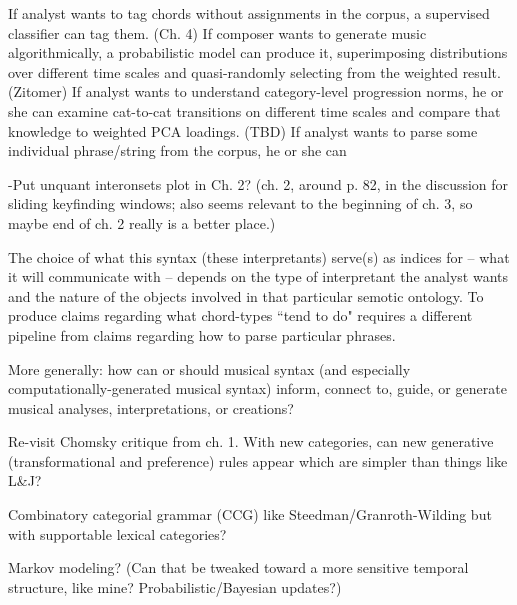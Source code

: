 
If analyst wants to tag chords without assignments in the corpus, a supervised classifier can tag them.  (Ch. 4)
If composer wants to generate music algorithmically, a probabilistic model can produce it, superimposing distributions over different time scales and quasi-randomly selecting from the weighted result.  (Zitomer)
If analyst wants to understand category-level progression norms, he or she can examine cat-to-cat transitions on different time scales and compare that knowledge to weighted PCA loadings.  (TBD)
If analyst wants to parse some individual phrase/string from the corpus, he or she can 

-Put unquant interonsets plot in Ch. 2?  (ch. 2, around p. 82, in the discussion for sliding keyfinding windows; also seems relevant to the beginning of ch. 3, so maybe end of ch. 2 really is a better place.)


The choice of what this syntax (these interpretants) serve(s) as indices for -- what it will communicate with -- depends on the type of interpretant the analyst wants and the nature of the objects involved in that particular semotic ontology.  To produce claims regarding what chord-types ``tend to do" requires a different pipeline from claims regarding how to parse particular phrases.

More generally: how can or should musical syntax (and especially computationally-generated musical syntax) inform, connect to, guide, or generate musical analyses, interpretations, or creations?

Re-visit Chomsky critique from ch. 1.  With new categories, can new generative (transformational and preference) rules appear which are simpler than things like L\&J?

Combinatory categorial grammar (CCG) like Steedman/Granroth-Wilding but with supportable lexical categories?

Markov modeling?  (Can that be tweaked toward a more sensitive temporal structure, like mine?  Probabilistic/Bayesian updates?)



